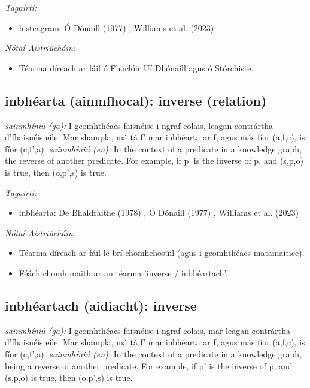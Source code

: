 \documentclass{article}
\begin{document}
 \noindent \textit{Tagairtí:}
\begin{itemize}
	\item histeagram: Ó Dónaill (1977) \cite{odonaill}, Williams et al. (2023) \cite{storchiste}
\end{itemize}

 \noindent \textit{Nótaí Aistriúcháin:}
\begin{itemize}
	\item Téarma díreach ar fáil ó Fhoclóir Uí Dhónaill agus ó Stórchiste.
\end{itemize}


\subsection*{inbhéarta (ainmfhocal): inverse (relation)} 
 \noindent \textit{sainmhíniú (ga):} I gcomhthéacs faisnéise i ngraf eolais, leagan contrártha d'fhaisnéis eile. Mar shampla, má tá f' mar inbhéarta ar f, agus más fíor (a,f,c), is fíor (c,f',a).
\newline\newline
 \noindent \textit{sainmhíniú (en):} In the context of a predicate in a knowledge graph, the reverse of another predicate. For example, if p' is the inverse of p, and (s,p,o) is true, then (o,p',s) is true.
\newline

 \noindent \textit{Tagairtí:}
\begin{itemize}
	\item inbhéarta: De Bhaldraithe (1978) \cite{de-bhaldraithe}, Ó Dónaill (1977) \cite{odonaill}, Williams et al. (2023) \cite{storchiste}
\end{itemize}

 \noindent \textit{Nótaí Aistriúcháin:}
\begin{itemize}
	\item Téarma díreach ar fáil le brí chomhchosúil (agus i gcomhthéacs matamaitice).
	\item Féách chomh maith ar an téarma 'inverse / inbhéartach'.
\end{itemize}


\subsection*{inbhéartach (aidiacht): inverse} 
 \noindent \textit{sainmhíniú (ga):} I gcomhthéacs faisnéise i ngraf eolais, mar leagan contrártha d'fhaisnéis eile. Mar shampla, má tá f' mar inbhéarta ar f, agus más fíor (a,f,c), is fíor (c,f',a).
\newline\newline
 \noindent \textit{sainmhíniú (en):} In the context of a predicate in a knowledge graph, being a reverse of another predicate. For example, if p' is the inverse of p, and (s,p,o) is true, then (o,p',s) is true.
\newline
\end{document}
